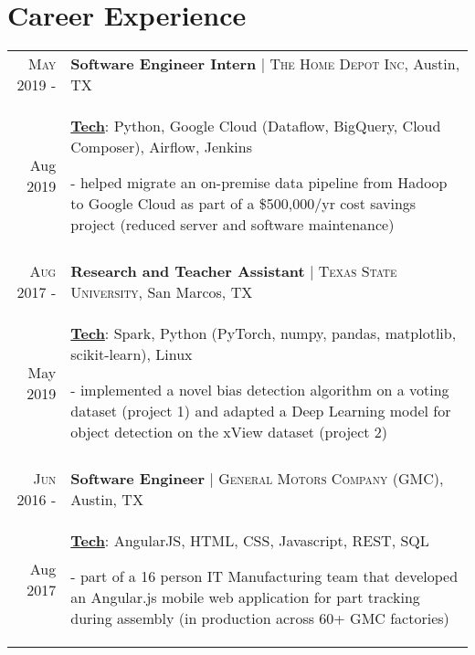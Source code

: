 \documentclass[a4paper,10pt]{article}
\begin{document}
\section{Career Experience}
\begin{tabular}{r|p{12cm}}

\textsc{May 2019 -} & \textbf{Software Engineer Intern} | \textsc{The Home Depot Inc}, Austin, TX \\
Aug 2019 & \small{
	\textbf{\underline{Tech}}: Python, Google Cloud (Dataflow, BigQuery, Cloud Composer), Airflow, Jenkins}

	\tiny{
	\vphantom{a}
	}
	
	\small{
	- helped migrate an on-premise data pipeline from Hadoop to Google Cloud as part of a \$500,000/yr cost savings project (reduced server and software maintenance) } \\
 \multicolumn{2}{c}{} \\

\textsc{Aug 2017 -} & \textbf{Research and Teacher Assistant} | \textsc{Texas State University}, San Marcos, TX \\
May 2019 & \small{
	\textbf{\underline{Tech}}: Spark, Python (PyTorch, numpy, pandas, matplotlib, scikit-learn), Linux
	}

	\tiny{
	\vphantom{a}
	}

	\small{
	
	- implemented a novel bias detection algorithm on a voting dataset (project 1) and adapted a Deep Learning model for object detection on the xView dataset (project 2)	} \\
 \multicolumn{2}{c}{} \\


 \textsc{Jun 2016 -} & \textbf{Software Engineer} | \textsc{General Motors Company (GMC)}, Austin, TX \\
Aug 2017 & \small{
	\textbf{\underline{Tech}}: AngularJS, HTML, CSS, Javascript, REST, SQL}

	\tiny{
	\vphantom{a}
	}
	
	\small{
	- part of a 16 person IT Manufacturing team that developed an Angular.js mobile web application for part tracking during assembly (in production across 60+ GMC factories)} \\
\end{tabular}


\end{document}
